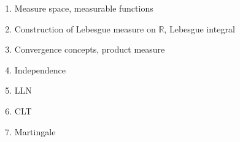 \begin{enumerate}
    \item Measure space, measurable functions
    \item Construction of Lebesgue measure on \(\mathbb{R}\), Lebesgue integral
    \item Convergence concepts, product measure
    \item Independence
    \item LLN
    \item CLT
    \item Martingale 
\end{enumerate}